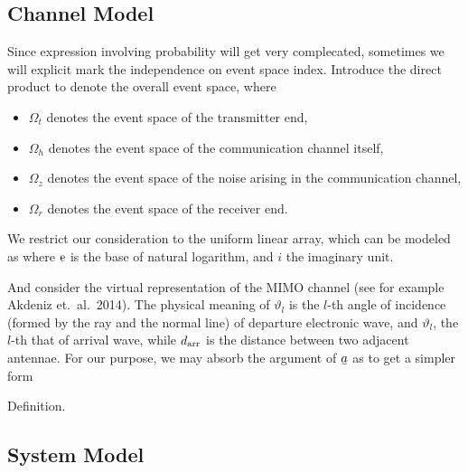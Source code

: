 
\subsection{Channel Model}

Since expression involving probability will get very complecated, sometimes we will explicit mark the independence on event space index.
Introduce the direct product
%
%
to denote the overall event space, where

\begin{itemize}
\item \(\Omega_t\) denotes the event space of the transmitter end,
\item \(\Omega_h\) denotes the event space of the communication channel itself,
\item \(\Omega_z\) denotes the event space of the noise arising in the communication channel,
\item \(\Omega_r\) denotes the event space of the receiver end.
\end{itemize}
%

We restrict our consideration to the uniform linear array, which can be modeled as
%
%
where \(\mathrm{e}\) is the base of natural logarithm, and \(i\) the imaginary unit.

And consider the virtual representation of the MIMO channel (see for example Akdeniz et.\ al.\ 2014).
%
%
The physical meaning of \(\vartheta_l\) is the \(l\)-th angle of incidence (formed by the ray and the normal line) of departure electronic wave, and \(\vartheta_l\), the \(l\)-th that of arrival wave, while \(d_{\mathrm{arr}}\) is the distance between two adjacent antennae.
For our purpose, we may absorb the argument of \(\V{a}\) as
%
%
to get a simpler form
%
%

\Result
{Definition.}
{
}

\subsection{System Model}

